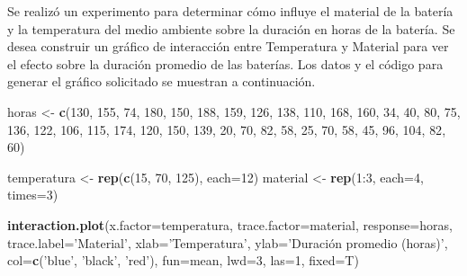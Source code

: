 \documentclass[10pt,]{krantz}
\makeatletter
\newenvironment{Shaded}{\begin{snugshade}}{\end{snugshade}}
\newcommand{\KeywordTok}[1]{\textcolor[rgb]{0.13,0.29,0.53}{\textbf{{#1}}}}
\newcommand{\DataTypeTok}[1]{\textcolor[rgb]{0.13,0.29,0.53}{{#1}}}
\newcommand{\DecValTok}[1]{\textcolor[rgb]{0.00,0.00,0.81}{{#1}}}
\newcommand{\StringTok}[1]{\textcolor[rgb]{0.31,0.60,0.02}{{#1}}}
\newcommand{\NormalTok}[1]{{#1}}
\newenvironment{kframe}{%
\medskip{}
\setlength{\fboxsep}{.8em}
 \def\at@end@of@kframe{}%
 \ifinner\ifhmode%
  \def\at@end@of@kframe{\end{minipage}}%
  \begin{minipage}{\columnwidth}%
 \fi\fi%
 \def\FrameCommand##1{\hskip\@totalleftmargin \hskip-\fboxsep
 \colorbox{shadecolor}{##1}\hskip-\fboxsep
     \hskip-\linewidth \hskip-\@totalleftmargin \hskip\columnwidth}%
 \MakeFramed {\advance\hsize-\width
   \@totalleftmargin\z@ \linewidth\hsize
   \@setminipage}}%
 {\par\unskip\endMakeFramed%
 \at@end@of@kframe}
\renewenvironment{Shaded}{\begin{kframe}}{\end{kframe}}
\makeatother
\begin{document}
Se realizó un experimento para determinar cómo influye el material de la
batería y la temperatura del medio ambiente sobre la duración en horas
de la batería. Se desea construir un gráfico de interacción entre
Temperatura y Material para ver el efecto sobre la duración promedio de
las baterías. Los datos y el código para generar el gráfico solicitado
se muestran a continuación.

\begin{Shaded}
\begin{Highlighting}[]
\NormalTok{horas <-}\StringTok{ }\KeywordTok{c}\NormalTok{(}\DecValTok{130}\NormalTok{, }\DecValTok{155}\NormalTok{, }\DecValTok{74}\NormalTok{, }\DecValTok{180}\NormalTok{, }\DecValTok{150}\NormalTok{, }\DecValTok{188}\NormalTok{, }\DecValTok{159}\NormalTok{, }\DecValTok{126}\NormalTok{, }\DecValTok{138}\NormalTok{, }\DecValTok{110}\NormalTok{, }\DecValTok{168}\NormalTok{, }
           \DecValTok{160}\NormalTok{, }\DecValTok{34}\NormalTok{, }\DecValTok{40}\NormalTok{, }\DecValTok{80}\NormalTok{, }\DecValTok{75}\NormalTok{, }\DecValTok{136}\NormalTok{, }\DecValTok{122}\NormalTok{, }\DecValTok{106}\NormalTok{, }\DecValTok{115}\NormalTok{, }\DecValTok{174}\NormalTok{, }\DecValTok{120}\NormalTok{, }\DecValTok{150}\NormalTok{, }
           \DecValTok{139}\NormalTok{, }\DecValTok{20}\NormalTok{, }\DecValTok{70}\NormalTok{, }\DecValTok{82}\NormalTok{, }\DecValTok{58}\NormalTok{, }\DecValTok{25}\NormalTok{, }\DecValTok{70}\NormalTok{, }\DecValTok{58}\NormalTok{, }\DecValTok{45}\NormalTok{, }\DecValTok{96}\NormalTok{, }\DecValTok{104}\NormalTok{, }\DecValTok{82}\NormalTok{, }\DecValTok{60}\NormalTok{)}

\NormalTok{temperatura <-}\StringTok{ }\KeywordTok{rep}\NormalTok{(}\KeywordTok{c}\NormalTok{(}\DecValTok{15}\NormalTok{, }\DecValTok{70}\NormalTok{, }\DecValTok{125}\NormalTok{), }\DataTypeTok{each=}\DecValTok{12}\NormalTok{)}
\NormalTok{material    <-}\StringTok{ }\KeywordTok{rep}\NormalTok{(}\DecValTok{1}\NormalTok{:}\DecValTok{3}\NormalTok{, }\DataTypeTok{each=}\DecValTok{4}\NormalTok{, }\DataTypeTok{times=}\DecValTok{3}\NormalTok{)}

\KeywordTok{interaction.plot}\NormalTok{(}\DataTypeTok{x.factor=}\NormalTok{temperatura, }\DataTypeTok{trace.factor=}\NormalTok{material,}
                 \DataTypeTok{response=}\NormalTok{horas, }\DataTypeTok{trace.label=}\StringTok{'Material'}\NormalTok{,}
                 \DataTypeTok{xlab=}\StringTok{'Temperatura'}\NormalTok{,}
                 \DataTypeTok{ylab=}\StringTok{'Duración promedio (horas)'}\NormalTok{,}
                 \DataTypeTok{col=}\KeywordTok{c}\NormalTok{(}\StringTok{'blue'}\NormalTok{, }\StringTok{'black'}\NormalTok{, }\StringTok{'red'}\NormalTok{),}
                 \DataTypeTok{fun=}\NormalTok{mean, }\DataTypeTok{lwd=}\DecValTok{3}\NormalTok{, }\DataTypeTok{las=}\DecValTok{1}\NormalTok{, }\DataTypeTok{fixed=}\NormalTok{T)}
\end{Highlighting}
\end{Shaded}
\end{document}

